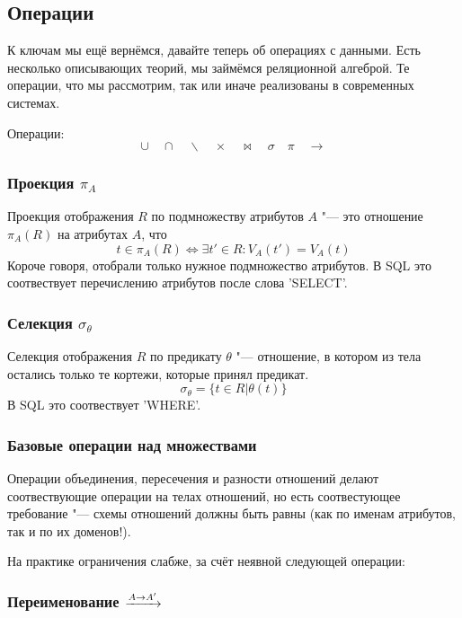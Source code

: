 \subsection{Операции}

К ключам мы ещё вернёмся, давайте теперь об операциях с данными.
Есть несколько описывающих теорий, мы займёмся реляционной алгеброй.
Те операции, что мы рассмотрим, так или иначе реализованы в современных системах.

Операции:
\[ ∪ \quad ∩ \quad ∖ \quad × \quad \bowtie \quad σ \quad π \quad → \]

\subsubsection{Проекция \texorpdfstring{$π_A$}{π\_A}}

Проекция отображения $R$ по подмножеству атрибутов $A$ "--- это отношение $π_A(R)$ на атрибутах $A$, что
\[ t ∈ π_A(R) ⇔ ∃ t' ∈ R\colon V_A(t') = V_A(t) \]
Короче говоря, отобрали только нужное подмножество атрибутов. В SQL это соотвествует перечислению атрибутов после слова \sql'SELECT'.

\subsubsection{Селекция \texorpdfstring{$σ_θ$}{σ\_θ}}

Селекция отображения $R$ по предикату $θ$ "--- отношение, в котором из тела остались только те кортежи, которые принял предикат.
\[ σ_θ = \{ t ∈ R | θ(t) \} \]
В SQL это соотвествует \sql'WHERE'.

\subsubsection{Базовые операции над множествами}

Операции объединения, пересечения и разности отношений делают соотвествующие операции на телах отношений,
но есть соотвестующее требование "--- схемы отношений должны быть равны (как по именам атрибутов, так и по их доменов!).

На практике ограничения слабже, за счёт неявной следующей операции:

\def\xra{\xrightarrow}
\subsubsection{Переименование \texorpdfstring{$\xra{A \ra A'}$}{-- A-A' ->}}

